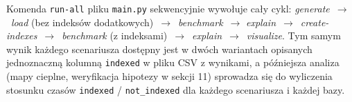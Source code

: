 Komenda \texttt{run-all} pliku \texttt{main.py} sekwencyjnie
wywołuje cały cykl: \emph{generate}~$\rightarrow$~\emph{load}
(bez indeksów dodatkowych)~$\rightarrow$~\emph{benchmark}~$\rightarrow$
\emph{explain}~$\rightarrow$~\emph{create-indexes}~$\rightarrow$~\emph{benchmark}
(z indeksami)~$\rightarrow$~\emph{explain}~$\rightarrow$~\emph{visualize}.
Tym samym wynik każdego scenariusza dostępny jest w dwóch wariantach
opisanych jednoznaczną kolumną \texttt{indexed} w pliku CSV
z wynikami, a późniejsza analiza (mapy cieplne, weryfikacja
hipotezy w sekcji 11) sprowadza się do wyliczenia stosunku
czasów \texttt{indexed} / \texttt{not\_indexed} dla każdego
scenariusza i każdej bazy.
